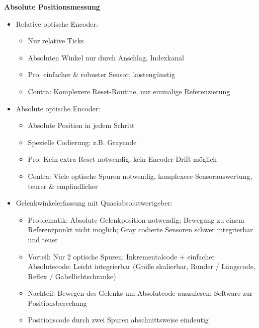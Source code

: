 \textbf{Absolute Positionsmessung}
\begin{itemize}
\setlength\itemsep{0em}
\item Relative optische Encoder:
\begin{itemize}
\setlength\itemsep{0em}
\item Nur relative Ticks
\item Absoluten Winkel nur durch Anschlag, Indexkanal
\item Pro: einfacher \& robuster Sensor, kostengünstig
\item Contra: Komplexere Reset-Routine, nur einmalige Referenzierung
\end{itemize}
\item Absolute optische Encoder: 
\begin{itemize}
\setlength\itemsep{0em}
\item Absolute Position in jedem Schritt
\item Spezielle Codierung: z.B. Graycode
\item Pro: Kein extra Reset notwendig, kein Encoder-Drift möglich
\item Contra: Viele optische Spuren notwendig, komplexere Sensorauswertung, teurer \& empfindlicher
\end{itemize}
\item Gelenkwinkelerfassung mit Quasiabsolutwertgeber:
\begin{itemize}
\setlength\itemsep{0em}
\item Problematik: Absolute Gelenkposition notwendig; Bewegung zu einem Referenzpunkt nicht möglich; Gray codierte Sensoren schwer integrierbar und teuer
\item Vorteil: Nur 2 optische Spuren; Inkrementalcode + einfacher Absolutecode; Leicht integrierbar (Größe skalierbar, Runder / Längscode, Reflex / Gabellichtschranke)
\item Nachteil: Bewegen des Gelenks um Absolutcode auszulesen; Software zur Positionsberechung
\item Positionscode durch zwei Spuren abschnittsweise eindeutig
\end{itemize}
\end{itemize}
